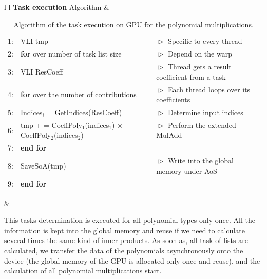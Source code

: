 \documentclass[oribibl]{llncs2e/llncs}
\begin{document}
 \begin{table}[t] 
	\begin{center}
	 	\begin{tabular}{l l}
                           \hline 
                           \textbf{Task execution}  Algorithm &  \\ \hline
                           \begin{tabular}{c l l} 
                               \tiny{1:} & VLI tmp   &  $\vartriangleright$ Specific to every thread  \\
                               \tiny{2:} &  \textbf{for} over number of task list size &$\vartriangleright$  Depend on the warp \\
                               \tiny{3:} &   VLI ResCoeff &$\vartriangleright$  Thread gets a result coefficient from a task \\
                               \tiny{4:} &  \hspace{0.2 cm}  \textbf{for} over the number of contributions  & $\vartriangleright$ Each thread loops over its coefficients \\
                               \tiny{5:} &  \hspace{0.4 cm}   Indices$_i$ = GetIndices(ResCoeff) &$\vartriangleright$ Determine input indices \\
                               \tiny{6:} &  \hspace{0.4 cm}   tmp + = CoeffPoly$_1$(indices$_1$) $\times$ CoeffPoly$_2$(indices$_2$) &$\vartriangleright$ Perform the extended MulAdd  \\
                               \tiny{7:} &  \hspace{0.2 cm}   \textbf{end for} &\\
                               \tiny{8:} &  SaveSoA(tmp) & $\vartriangleright$ Write into the global memory under AoS \\                               
                               \tiny{9:} &  \textbf{end for} &\\                               
                          \end{tabular} &  \\ \hline
		 \end{tabular} 
		 \caption{Algorithm of the task execution on GPU for the polynomial multiplications. \label{ALGO}}
	\end{center}
\end{table} 

This tasks determination is executed for all polynomial types only once. All the information is kept into the global memory and reuse if we need to calculate several times the same kind of inner products.
 As soon as,  all task of lists are calculated,  we transfer the data of the polynomials asynchronously onto the device (the global memory of the GPU is allocated only once and reuse),
 and the calculation of all polynomial multiplications start.
 
\end{document}
